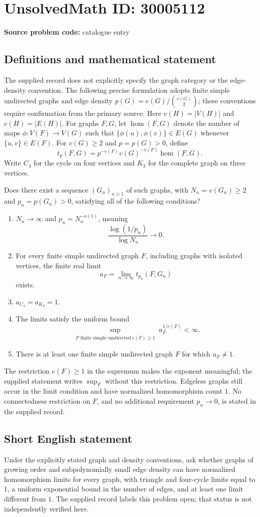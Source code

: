 \documentclass[11pt]{article}
\begin{document}
\section*{UnsolvedMath ID: 30005112}
\textbf{Source problem code:} catalogue entry
\subsection{Definitions and mathematical statement}
The supplied record does not explicitly specify the graph category or the edge-density convention. The following precise formulation adopts finite simple undirected graphs and edge density \(p(G)=e(G)/\binom{v(G)}{2}\); these conventions require confirmation from the primary source. Here \(v(H)=|V(H)|\) and \(e(H)=|E(H)|\). For graphs \(F,G\), let \(\operatorname{hom}(F,G)\) denote the number of maps \(\phi:V(F)\to V(G)\) such that \(\{\phi(u),\phi(v)\}\in E(G)\) whenever \(\{u,v\}\in E(F)\). For \(v(G)\geq2\) and \(p=p(G)>0\), define
\[
t_p(F,G)=p^{-e(F)}v(G)^{-v(F)}\operatorname{hom}(F,G).
\]
Write \(C_4\) for the cycle on four vertices and \(K_3\) for the complete graph on three vertices.

Does there exist a sequence \((G_n)_{n\geq1}\) of such graphs, with \(N_n=v(G_n)\geq2\) and \(p_n=p(G_n)>0\), satisfying all of the following conditions?
\begin{enumerate}
\item \(N_n\to\infty\) and \(p_n=N_n^{-o(1)}\), meaning
\[
\frac{\log(1/p_n)}{\log N_n}\longrightarrow0.
\]
\item For every finite simple undirected graph \(F\), including graphs with isolated vertices, the finite real limit
\[
a_F=\lim_{n\to\infty}t_{p_n}(F,G_n)
\]
exists.
\item \(a_{C_4}=a_{K_3}=1\).
\item The limits satisfy the uniform bound
\[
\sup_{\substack{F\text{ finite simple undirected}\ e(F)\geq1}}a_F^{1/e(F)}<\infty.
\]
\item There is at least one finite simple undirected graph \(F\) for which \(a_F\neq1\).
\end{enumerate}
The restriction \(e(F)\geq1\) in the supremum makes the exponent meaningful; the supplied statement writes \(\sup_F\) without this restriction. Edgeless graphs still occur in the limit condition and have normalized homomorphism count \(1\). No connectedness restriction on \(F\), and no additional requirement \(p_n\to0\), is stated in the supplied record.
\subsection{Short English statement}
Under the explicitly stated graph and density conventions, ask whether graphs of growing order and subpolynomially small edge density can have normalized homomorphism limits for every graph, with triangle and four-cycle limits equal to \(1\), a uniform exponential bound in the number of edges, and at least one limit different from \(1\). The supplied record labels this problem open; that status is not independently verified here.
\end{document}
